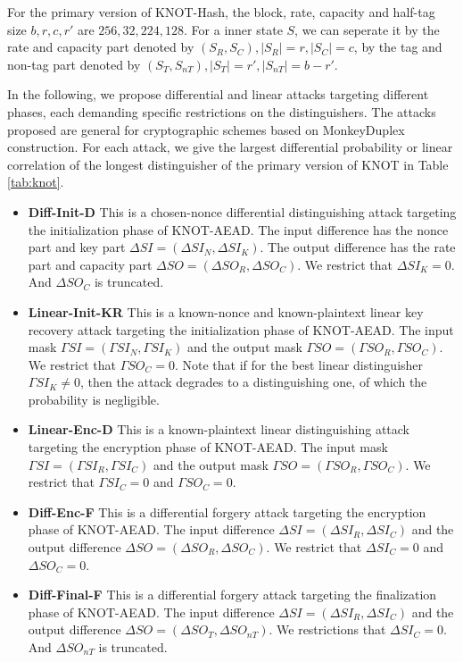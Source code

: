 For the primary version of KNOT-Hash, the block, rate, capacity and half-tag size $b,r,c,r'$ are $256,32,224,128$. For a inner state $S$, we can seperate it by the rate and capacity part denoted by $(S_R,S_C),|S_R|=r,|S_C|=c$, by the tag and non-tag part denoted by $(S_T,S_{nT}),|S_T|=r',|S_{nT}|=b-r'$.

In the following, we propose differential and linear attacks targeting different phases, each demanding specific restrictions on the distinguishers. The attacks proposed are general for cryptographic schemes based on MonkeyDuplex construction. For each attack, we give the largest differential probability or linear correlation of the longest distinguisher of the primary version of KNOT in Table \ref{tab:knot}.

\begin{itemize}
	\item \textbf{Diff-Init-D} This is a chosen-nonce differential distinguishing attack targeting the initialization phase of KNOT-AEAD. The input difference has the nonce part and key part $\Delta SI=(\Delta SI_N,\Delta SI_K)$. The output difference has the rate part and capacity part $\Delta SO=(\Delta SO_R,\Delta SO_C)$. We restrict that $\Delta SI_K=0$. And $\Delta SO_C$ is truncated. 
	\item \textbf{Linear-Init-KR} This is a known-nonce and known-plaintext linear key recovery attack targeting the initialization phase of KNOT-AEAD. The input mask $\Gamma SI=(\Gamma SI_N,\Gamma SI_K)$ and the output mask $\Gamma SO=(\Gamma SO_R,\Gamma SO_C)$. We restrict that $\Gamma SO_C=0$. Note that if for the best linear distinguisher $\Gamma SI_K\neq 0$, then the attack degrades to a distinguishing one, of which the probability is negligible. 
	\item \textbf{Linear-Enc-D} This is a known-plaintext linear distinguishing attack targeting the encryption phase of KNOT-AEAD. The input mask $\Gamma SI=(\Gamma SI_R,\Gamma SI_C)$ and the output mask $\Gamma SO=(\Gamma SO_R,\Gamma SO_C)$. We restrict that $\Gamma SI_C=0$ and $\Gamma SO_C=0$. 
	\item \textbf{Diff-Enc-F} This is a differential forgery attack targeting the encryption phase of KNOT-AEAD. The input difference $\Delta SI=(\Delta SI_R,\Delta SI_C)$ and the output difference $\Delta SO=(\Delta SO_R,\Delta SO_C)$. We restrict that $\Delta SI_C=0$ and $\Delta SO_C=0$. 
	\item \textbf{Diff-Final-F} This is a differential forgery attack targeting the finalization phase of KNOT-AEAD. The input difference $\Delta SI=(\Delta SI_R,\Delta SI_C)$ and the output difference $\Delta SO=(\Delta SO_T,\Delta SO_{nT})$. We restrictions that $\Delta SI_C=0$. And $\Delta SO_{nT}$ is truncated. 

\end{itemize}
